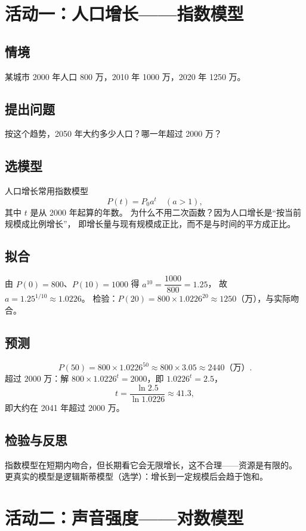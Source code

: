 \section{活动一：人口增长——指数模型}

\subsection{情境}
某城市 2000 年人口 800 万，2010 年 1000 万，2020 年 1250 万。

\subsection{提出问题}
按这个趋势，2050 年大约多少人口？哪一年超过 2000 万？

\subsection{选模型}
人口增长常用指数模型
\[
  P(t)=P_0a^t\quad(a>1),
\]
其中 $t$ 是从 2000 年起算的年数。
为什么不用二次函数？因为人口增长是“按当前规模成比例增长”，
即增长量与现有规模成正比，而不是与时间的平方成正比。

\subsection{拟合}
由 $P(0)=800$、$P(10)=1000$ 得 $a^{10}=\dfrac{1000}{800}=1.25$，
故 $a=1.25^{1/10}\approx1.0226$。
检验：$P(20)=800\times1.0226^{20}\approx1250$（万），与实际吻合。

\subsection{预测}
\[
  P(50)=800\times1.0226^{50}\approx800\times3.05\approx2440\text{（万）}.
\]
超过 $2000$ 万：解 $800\times1.0226^t=2000$，即 $1.0226^t=2.5$，
\[
  t=\frac{\ln2.5}{\ln1.0226}\approx41.3,
\]
即大约在 2041 年超过 2000 万。

\subsection{检验与反思}
指数模型在短期内吻合，但长期看它会无限增长，这不合理——资源是有限的。
更真实的模型是逻辑斯蒂模型（选学）：增长到一定规模后会趋于饱和。

\section{活动二：声音强度——对数模型}

